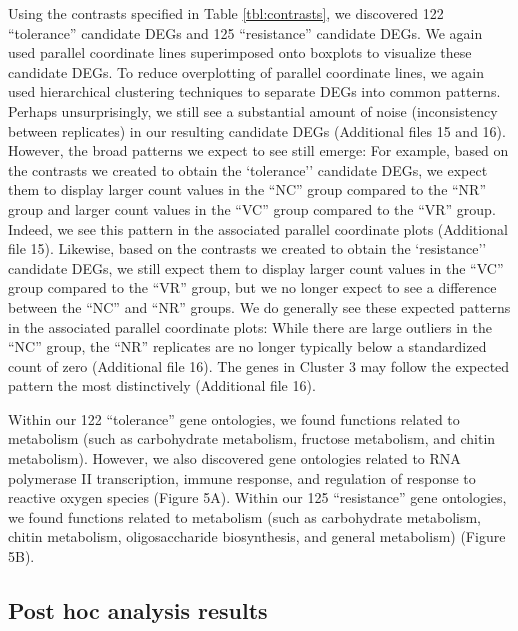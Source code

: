 \documentclass{bmcart}
\begin{document}
\begin{linenumbers}
\begin{doublespacing}
Using the contrasts specified in Table \ref{tbl:contrasts}, we discovered 122 ``tolerance'' candidate DEGs and 125 ``resistance'' candidate DEGs. We again used parallel coordinate lines superimposed onto boxplots to visualize these candidate DEGs. To reduce overplotting of parallel coordinate lines, we again used hierarchical clustering techniques to separate DEGs into common patterns. Perhaps unsurprisingly, we still see a substantial amount of noise (inconsistency between replicates) in our resulting candidate DEGs (Additional files 15 and 16). However, the broad patterns we expect to see still emerge: For example, based on the contrasts we created to obtain the `tolerance'' candidate DEGs, we expect them to display larger count values in the ``NC'' group compared to the ``NR'' group and larger count values in the ``VC'' group compared to the ``VR'' group. Indeed, we see this pattern in the associated parallel coordinate plots (Additional file 15). Likewise, based on the contrasts we created to obtain the `resistance'' candidate DEGs, we still expect them to display larger count values in the ``VC'' group compared to the ``VR'' group, but we no longer expect to see a difference between the ``NC'' and ``NR'' groups. We do generally see these expected patterns in the associated parallel coordinate plots: While there are large outliers in the ``NC'' group, the ``NR'' replicates are no longer typically below a standardized count of zero (Additional file 16). The genes in Cluster 3 may follow the expected pattern the most distinctively (Additional file 16).

Within our 122 ``tolerance'' gene ontologies, we found functions related to metabolism (such as carbohydrate metabolism, fructose metabolism, and chitin metabolism). However, we also discovered gene ontologies related to RNA polymerase II transcription, immune response, and regulation of response to reactive oxygen species (Figure 5A). Within our 125 ``resistance'' gene ontologies, we found functions related to metabolism (such as carbohydrate metabolism, chitin metabolism, oligosaccharide biosynthesis, and general metabolism) (Figure 5B).

\subsection*{Post hoc analysis results}


\end{doublespacing}
\end{linenumbers}
\end{document}
